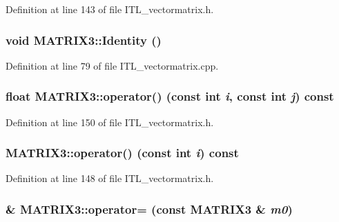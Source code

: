 Definition at line 143 of file ITL\_\-vectormatrix.h.

\hypertarget{classMATRIX3_af765df1cefaaacc2e8f1e27f2041ca15}{
\subsubsection[{Identity}]{\setlength{\rightskip}{0pt plus 5cm}void MATRIX3::Identity ()}}
\label{classMATRIX3_af765df1cefaaacc2e8f1e27f2041ca15}


Definition at line 79 of file ITL\_\-vectormatrix.cpp.

\hypertarget{classMATRIX3_a4c879e29653a167d5af33e297b46bdd4}{
\subsubsection[{operator()}]{\setlength{\rightskip}{0pt plus 5cm}float MATRIX3::operator() (const int {\em i}, \/  const int {\em j}) const}}
\label{classMATRIX3_a4c879e29653a167d5af33e297b46bdd4}


Definition at line 150 of file ITL\_\-vectormatrix.h.

\hypertarget{classMATRIX3_ae4ad5d725102c93251dd1da56dd9fab8}{
\subsubsection[{operator()}]{ MATRIX3::operator() (const int {\em i}) const}}
\label{classMATRIX3_ae4ad5d725102c93251dd1da56dd9fab8}


Definition at line 148 of file ITL\_\-vectormatrix.h.

\hypertarget{classMATRIX3_a6154de213d293b953f2be789a86a58eb}{
\subsubsection[{operator=}]{\& MATRIX3::operator= (const {\bf MATRIX3} \& {\em m0})}}
\label{classMATRIX3_a6154de213d293b953f2be789a86a58eb}


